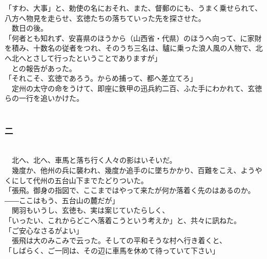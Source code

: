 \documentclass[
  paper=a5,
  fontsize=10pt,
  jafontsize=9.5pt,
  tate,                  %
  open_bracket_pos=nibu, %
]{jlreq}
\begin{document}
「すわ、大事」と、勅使の名におそれ、また、督郵のにも、うまく乗せられて、八方へ物見を走らせ、玄徳たちの落ちていった先を探させた。\\


　数日の後。\\


「何者とも知れず、安喜県のほうから（山西省・代県）のほうへ向って、に家財を積み、十数名の従者をつれ、そのうち三名は、驢に乗った浪人風の人物で、北へ北へとさして行ったということでありますが」\\


　との報告があった。\\


「それこそ、玄徳であろう。からめ捕って、都へ差立てろ」\\


　定州の太守の命をうけて、即座に鉄甲の迅兵約二百、ふた手にわかれて、玄徳らの一行を追いかけた。\\

\\

\subsubsection{二}

\\


　北へ、北へ、車馬と落ち行く人々の影はいそいだ。\\


　幾度か、他州の兵に襲われ、幾度か追手のに墜ちかかり、百難をこえ、ようやくにして代州の五台山下までたどりついた。\\


「張飛。御身の指図で、ここまではやって来たが何か落着く先のはあるのか。――ここはもう、五台山の麓だが」\\


　関羽もいうし、玄徳も、実は案じていたらしく、\\


「いったい、これからどこへ落着こうという考えか」と、共々に訊ねた。\\


「ご安心なさるがよい」\\


　張飛は大のみこみで云った。そしての平和そうな村へ行き着くと、\\


「しばらく、ご一同は、その辺に車馬を休めて待っていて下さい」\\
\end{document}
